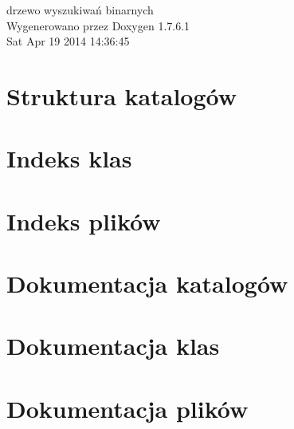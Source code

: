 \documentclass[a4paper]{book}
\begin{document}
\begin{titlepage}
\vspace*{7cm}
\begin{center}
{\Large drzewo wyszukiwań binarnych }\\
\vspace*{1cm}
{\large \-Wygenerowano przez Doxygen 1.7.6.1}\\
\vspace*{0.5cm}
{\small Sat Apr 19 2014 14:36:45}\\
\end{center}
\end{titlepage}
\clearemptydoublepage
{}
\tableofcontents
\clearemptydoublepage
{}
\chapter{\-Struktura katalogów}

\chapter{\-Indeks klas}

\chapter{\-Indeks plików}

\chapter{\-Dokumentacja katalogów}

\chapter{\-Dokumentacja klas}


\chapter{\-Dokumentacja plików}





\printindex
\end{document}
